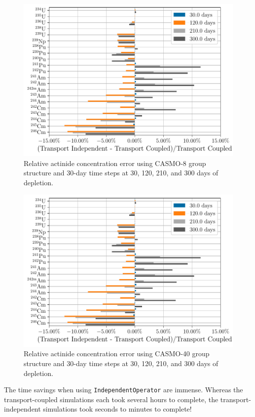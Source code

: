     \begin{figure}[h!tpb]
        \centering
        \includegraphics[width=\linewidth]{figs/actinides_casmo8_constant_xs_predictor_fission_q_months.pdf}
        \caption[]{Relative actinide concentration error using
        CASMO-8 group structure and 30-day time steps at 30, 120, 210, and 300
    days of depletion.}
        \label{fig:actinides-error-casmo8-xs-months}
    \end{figure}

    \begin{figure}[h!tpb]
        \centering
        \includegraphics[width=\linewidth]{figs/actinides_casmo40_constant_xs_predictor_fission_q_months.pdf}
        \caption{Relative actinide concentration error using
        CASMO-40 group structure and 30-day time steps at 30, 120, 210, and 300
    days of depletion.}
        \label{fig:actinides-error-casmo40-xs-months}
    \end{figure}


    The time savings when using \verb.IndependentOperator. are immense. Whereas
    the transport-coupled simulations each took several hours to complete, the
    transport-independent simulations took seconds to minutes to complete!
